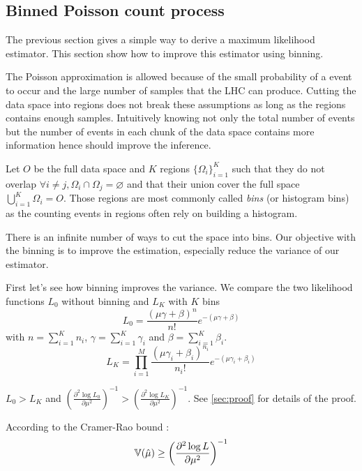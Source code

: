 \subsection{Binned Poisson count process} %
\label{sub:binned_poisson_count_process}

The previous section gives a simple way to derive a maximum likelihood estimator.
This section show how to improve this estimator using binning.

The Poisson approximation is allowed because of the small probability of a event to occur and the large number of samples that the LHC can produce.
Cutting the data space into regions does not break these assumptions as long as the regions contains enough samples.
Intuitively knowing not only the total number of events but the number of events in each chunk of the data space contains more information hence should improve the inference.

Let $O$ be the full data space and $K$ regions $\{\Omega_i\}_{i=1}^K$ such that they do not overlap $\forall i\neq j, \Omega_i \cap \Omega_j = \varnothing $ and that their union cover the full space $\bigcup_{i=1}^K \Omega_i = O$.
Those regions are most commonly called \emph{bins} (or histogram bins) as the counting events in regions often rely on building a histogram.

There is an infinite number of ways to cut the space into bins.
Our objective with the binning is to improve the estimation, especially reduce the variance of our estimator.

First let's see how binning improves the variance.
We compare the two likelihood functions $L_0$ without binning and $L_K$ with $K$ bins
\begin{equation}
    L_0 = \frac{(\mu \gamma + \beta)^n }{n!} e^{-(\mu \gamma + \beta)}
\end{equation}
with $n = \sum_{i=1}^K n_i $, $\gamma = \sum_{i=1}^K \gamma_i $ and $\beta = \sum_{i=1}^K \beta_i $.
\begin{equation}
    L_K = \prod_{i=1}^M \frac{(\mu \gamma_i + \beta_i)^{n_i} }{n_i!} e^{-(\mu \gamma_i + \beta_i)}
\end{equation}

$L_0 > L_K$ and 
$\left (\frac{\partial^2 \log L_0}{\partial \mu^2}\right )^{-1} > \left (\frac{\partial^2 \log L_K}{\partial \mu^2}\right )^{-1}$.
See \autoref{sec:proof} for details of the proof.

According to the Cramer-Rao bound :
\begin{equation}
    \mathbb{V}(\hat\mu) \geq \left (\frac{\partial^2 \log L}{\partial \mu^2}\right )^{-1}
\end{equation}

